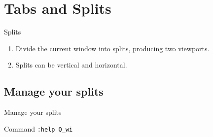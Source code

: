 \documentclass[11pt]{beamer}
\begin{document}
	\section{Tabs and Splits}
		
		\begin{frame}{Splits}
			\begin{enumerate}
				\item Divide the current window into splits, producing two viewports.
				\item Splits can be vertical and horizontal.
			\end{enumerate}
			\begin{center}
			\end{center}
		\end{frame}

		\subsection{Manage your splits}

			\begin{frame}{Manage your splits}
				\begin{block}{Command}
					\texttt{:help Q\_wi}
				\end{block}
			\end{frame}
\end{document}
